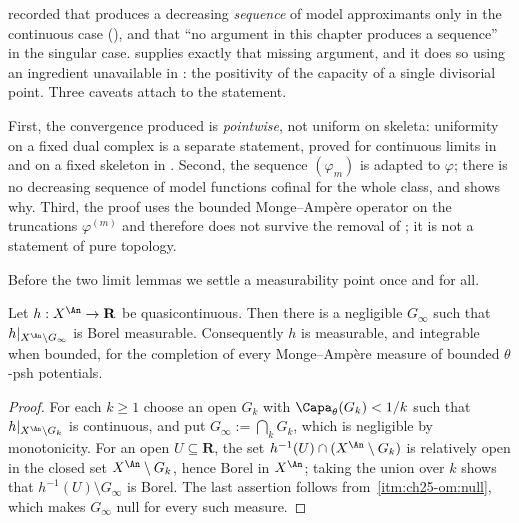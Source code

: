 \begin{remark}
\label{rem:ch25-sequential-vs-ch22}
 recorded that
 produces a decreasing \emph{sequence} of model
approximants only in the continuous case
(), and that ``no argument in
this chapter produces a sequence'' in the singular case.
 supplies exactly that missing
argument, and it does so using an ingredient unavailable in
: the positivity of the capacity of a single
divisorial point.  Three caveats attach to the statement.

First, the convergence produced is \emph{pointwise}, not uniform on
skeleta: uniformity on a fixed dual complex is a separate statement, proved
for continuous limits in  and
on a fixed skeleton in .  Second,
the sequence $(\varphi_m)$ is adapted to $\varphi$; there is no
decreasing sequence of model functions cofinal for the whole class, and
 shows why.  Third, the proof uses the
bounded Monge--Amp\`ere operator on the truncations
$\varphi^{(m)}$ and therefore does not survive the removal of
; it is not a statement of pure topology.
\end{remark}

Before the two limit lemmas we settle a measurability point once and for
all.

\begin{lemma}
\label{lem:ch25-quasicontinuous-measurable}
Let $h:X^{\An}\to\mathbf R$ be quasicontinuous.  Then there is a negligible
$G_\infty$ such that $h|_{X^{\An}\setminus G_\infty}$ is Borel
measurable.  Consequently $h$ is measurable, and integrable when bounded,
for the completion of every Monge--Amp\`ere measure of bounded
$\theta$-psh potentials.
\end{lemma}

\begin{proof}
For each $k\geq1$ choose an open $G_k$ with
$\Capa_\theta(G_k)<1/k$ such that $h|_{X^{\An}\setminus G_k}$ is
continuous, and put $G_\infty:=\bigcap_kG_k$, which is negligible by
monotonicity.  For an open $U\subseteq\mathbf R$, the set
$h^{-1}(U)\cap(X^{\An}\setminus G_k)$ is relatively open in the closed set
$X^{\An}\setminus G_k$, hence Borel in $X^{\An}$; taking the union over
$k$ shows that $h^{-1}(U)\setminus G_\infty$ is Borel.  The last
assertion follows from
\,\cref{itm:ch25-om:null}, which makes
$G_\infty$ null for every such measure.
\end{proof}

